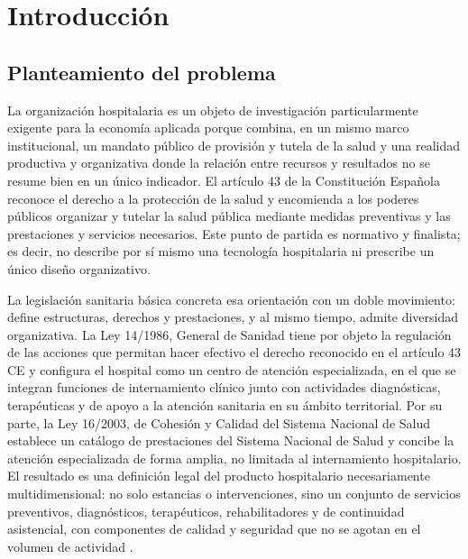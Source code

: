 ﻿\chapter{Introducción}
\label{ch:intro}

\section{Planteamiento del problema}

La organización hospitalaria es un objeto de investigación particularmente exigente para la economía aplicada porque combina, en un mismo marco institucional, un mandato público de provisión y tutela de la salud y una realidad productiva y organizativa donde la relación entre recursos y resultados no se resume bien en un único indicador. El artículo 43 de la Constitución Española reconoce el derecho a la protección de la salud y encomienda a los poderes públicos organizar y tutelar la salud pública mediante medidas preventivas y las prestaciones y servicios necesarios. Este punto de partida es normativo y finalista; es decir, no describe por sí mismo una tecnología hospitalaria ni prescribe un único diseño organizativo.

La legislación sanitaria básica concreta esa orientación con un doble movimiento: define estructuras, derechos y prestaciones, y al mismo tiempo, admite diversidad organizativa. La Ley 14/1986, General de Sanidad tiene por objeto la regulación de las acciones que permitan hacer efectivo el derecho reconocido en el artículo 43 CE y configura el hospital como un centro de atención especializada, en el que se integran funciones de internamiento clínico junto con actividades diagnósticas, terapéuticas y de apoyo a la atención sanitaria en su ámbito territorial. Por su parte, la Ley 16/2003, de Cohesión y Calidad del Sistema Nacional de Salud establece un catálogo de prestaciones del Sistema Nacional de Salud y concibe la atención especializada de forma amplia, no limitada al internamiento hospitalario. El resultado es una definición legal del producto hospitalario necesariamente multidimensional: no solo estancias o intervenciones, sino un conjunto de servicios preventivos, diagnósticos, terapéuticos, rehabilitadores y de continuidad asistencial, con componentes de calidad y seguridad que no se agotan en el volumen de actividad \citep{peman2005}.

